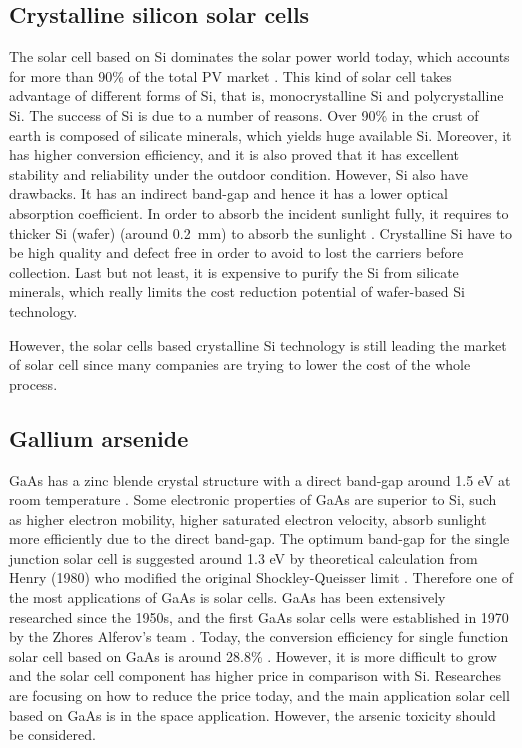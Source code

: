 \documentclass[a4paper, 12pt, titlepage,oneside,drop]{kthesis}
\begin{document}
\subsection{Crystalline silicon solar cells}
The solar cell based on Si dominates the solar power world today, which accounts for more than 90\% of the total PV market \cite{hoffmann2006pv}.
This kind of solar cell takes advantage of different forms of Si, that is, monocrystalline Si and polycrystalline Si. 
The success of Si is due to a number of reasons. Over 90\% in the crust of earth is composed of silicate minerals, which yields huge available Si. Moreover, it has higher conversion efficiency, and it is also proved that 
it has excellent stability and reliability under the outdoor condition. However, Si also have drawbacks. It has an indirect band-gap and hence it has a lower optical absorption coefficient. In order to absorb the incident sunlight fully, 
it requires to thicker Si (wafer) (around \SI{0.2} {\milli\meter}) to absorb the sunlight \cite{brewer2013renewable}. Crystalline Si have to be high quality and defect free in order to avoid to lost the carriers before collection. Last but not least, it is expensive to purify the Si from silicate minerals, which
really limits the cost reduction potential of wafer-based Si technology. 

However, the solar cells based crystalline Si technology is still leading the market of solar cell since many companies are trying to lower the cost of the whole process.



\subsection{Gallium arsenide}
GaAs has a zinc blende crystal structure with a direct band-gap around 1.5 eV at room temperature \cite{cardona2005fundamentals, madelung1996semiconductors, madelung2004semiconductors}. Some electronic properties of GaAs
are superior to Si, such as higher electron 
mobility, higher saturated electron velocity, absorb sunlight more efficiently due to the direct band-gap. The optimum band-gap for the single junction solar cell is suggested around 1.3 eV by theoretical calculation 
from Henry (1980) \cite{henry1980limiting} who modified the original Shockley-Queisser limit \cite{shockley1961detailed}. Therefore one of the most applications of GaAs is solar cells. GaAs has been extensively researched
since the 1950s, and the first GaAs solar cells were established in
1970 by the Zhores Alferov's team \cite{alferov2001nobel}. Today, the conversion efficiency for single function solar cell based on GaAs is around 28.8\% \cite{yablonovitch2012opto}. However, it is more difficult to grow and the
solar cell component has higher price in comparison with Si.
Researches are focusing on how to reduce the price today, and the main application solar cell based on GaAs is in the space application. However, the arsenic toxicity should be considered. 
\end{document}
